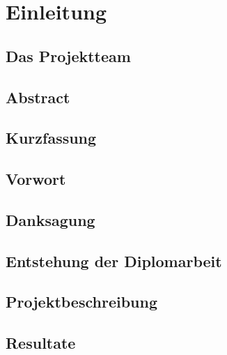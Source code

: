 \chapter{Einleitung}

\section{Das Projektteam}
\label{sec:team}


\section{Abstract}
\label{sec:abstract}

\section{Kurzfassung}
\label{sec:shortdesc}

\section{Vorwort}
\label{sec:preface}

\section{Danksagung}
\label{sec:acknowledgement}

\section{Entstehung der Diplomarbeit}
\label{sec:emerge}

\section{Projektbeschreibung}
\label{sec:desc}

\section{Resultate}
\label{sec:results}